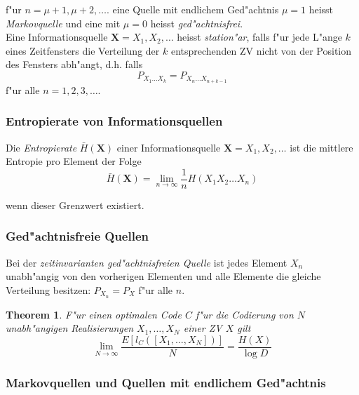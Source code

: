 \documentclass[german, 10pt, a4paper, twocolumn]{scrartcl}
\newtheorem{theorem}{Theorem}
\begin{document}
f"ur $n=\mu +1, \mu+2, \ldots$. eine Quelle mit endlichem Ged"achtnis $\mu=1$ heisst \textit{Markovquelle} und eine mit $\mu=0$ heisst \textit{ged"achtnisfrei}.\\

Eine Informationsquelle $\mathbf{X}=X_1,X_2,\ldots$ heisst \textit{station"ar}, falls f"ur jede L"ange $k$ eines Zeitfensters die Verteilung der $k$ entsprechenden ZV nicht von der Position des Fensters abh"angt, d.h. falls
\begin{displaymath}
	P_{X_1\ldots X_k}=P_{X_n\ldots X_{n+k-1}}
\end{displaymath}
f"ur alle $n=1,2,3,\ldots$.\\

\subsubsection{Entropierate von Informationsquellen}

Die \textit{Entropierate} $\bar{H}(\mathbf{X})$ einer Informationsquelle $\mathbf{X}=X_1,X_2,\ldots$ ist die mittlere Entropie pro Element der Folge
\begin{displaymath}
	\bar{H}(\mathbf{X})=\lim_{n \to \infty} \frac{1}{n} H(X_1 X_2 \ldots X_n)
\end{displaymath}

wenn dieser Grenzwert existiert.

\subsubsection{Ged"achtnisfreie Quellen}

Bei der \textit{zeitinvarianten ged"achtnisfreien Quelle} ist jedes Element $X_n$ unabh"angig von den vorherigen Elementen und alle Elemente die gleiche Verteilung besitzen: $P_{X_n}=P_X$ f"ur alle $n$.

\begin{theorem}
	F"ur einen optimalen Code $C$ f"ur die Codierung von $N$ unabh"angigen Realisierungen $X_1,\ldots,X_N$ einer ZV $X$ gilt
	\begin{displaymath}
		\lim_{N\to \infty}\frac{E[l_C([X_1,\ldots,X_N])]}{N}=\frac{H(X)}{\log D}
	\end{displaymath}
\end{theorem}

\subsubsection{Markovquellen und Quellen mit endlichem Ged"achtnis}
\end{document}
